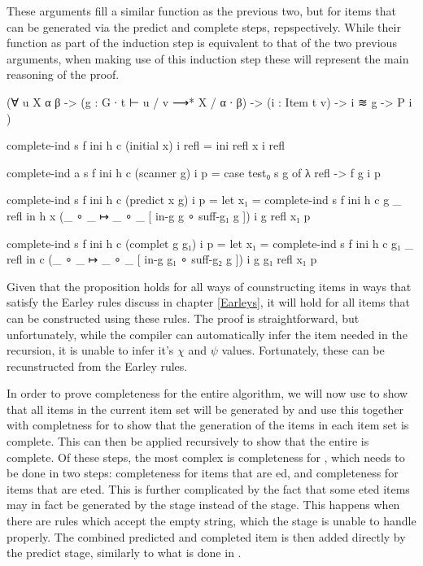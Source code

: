 		These arguments fill a similar function as the previous two, but for 
		items that can be generated via the predict and complete steps, 
		repspectively. While their function as part of the induction step is 
		equivalent to that of the two previous arguments, when making use of 
		this induction step these will represent the main reasoning of the 
		proof.
		
		\begin{code}
			  (∀ {u X α β} ->
			    (g : G ∙ t ⊢ u / v ⟶* X / α ∙ β) ->
			    (i : Item t v) ->
			    i ≋ g ->
			    P i
			  )

			complete-ind s f ini h c (initial x) i refl =
			  ini refl x i refl
			
			complete-ind {a} s f ini h c (scanner g) i p =
			  case test₀ s g of λ {refl -> f g i p}
			
			complete-ind s f ini h c (predict x g) i p =
			  let x₁ = complete-ind s f ini h c g _ refl in
			  h x (_ ∘ _ ↦ _ ∘ _ [ in-g g ∘ suff-g₁ g ]) i g refl x₁ p
			
			complete-ind s f ini h c (complet g g₁) i p =
			  let x₁ = complete-ind s f ini h c g₁ _ refl in
			  c (_ ∘ _ ↦ _ ∘ _ [ in-g g₁ ∘ suff-g₂ g ]) i g g₁ refl x₁ p
		\end{code}

		Given that the proposition holds for all ways of counstructing items in
		ways that satisfy the Earley rules discuss in chapter \ref{Earleys}, it
		will hold for all items that can be constructed using these rules. The
		proof is straightforward, but unfortunately, while the compiler can
		automatically infer the item needed in the recursion, it is unable to 
		infer it's $\chi$ and $\psi$ values. Fortunately, these can be 
		recunstructed from the Earley rules.
		
		In order to prove completeness for the entire algorithm, we will now
		use  to show that all items in the current item
		set will be generated by  and use this together with
		completness for  to show that the generation of the items
		in each item set is complete. This can then be applied recursively to
		show that the entire  is complete. Of these steps, the
		most complex is completeness for , which needs to be
		done in two steps: completeness for items that are ed,
		and completeness for items that are eted. This is further
		complicated by the fact that some eted items may in fact
		be generated by the  stage instead of the
		 stage. This happens when there are rules which accept
		the empty string, which the  stage is unable to handle
		properly. The combined predicted and completed item is then added
		directly by the predict stage, similarly to what is done in
		\cite{aycock02}.

